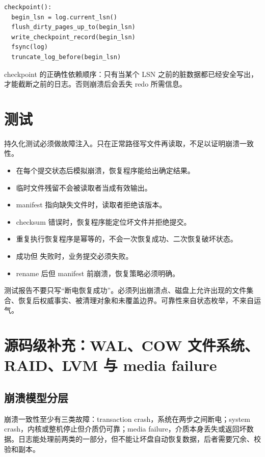 \begin{lstlisting}
checkpoint():
  begin_lsn = log.current_lsn()
  flush_dirty_pages_up_to(begin_lsn)
  write_checkpoint_record(begin_lsn)
  fsync(log)
  truncate_log_before(begin_lsn)
\end{lstlisting}

checkpoint 的正确性依赖顺序：只有当某个 LSN 之前的脏数据都已经安全写出，才能截断之前的日志。否则崩溃后会丢失 redo 所需信息。

\section{测试}

持久化测试必须做故障注入。只在正常路径写文件再读取，不足以证明崩溃一致性。

\begin{itemize}
\tightlist
\item 在每个提交状态后模拟崩溃，恢复程序能给出确定结果。
\item 临时文件残留不会被读取者当成有效输出。
\item manifest 指向缺失文件时，读取者拒绝该版本。
\item checksum 错误时，恢复程序能定位坏文件并拒绝提交。
\item 重复执行恢复程序是幂等的，不会一次恢复成功、二次恢复破坏状态。
\item {} 成功但  失败时，业务提交必须失败。
\item rename 后但 manifest 前崩溃，恢复策略必须明确。
\end{itemize}

测试报告不要只写“断电恢复成功”。必须列出崩溃点、磁盘上允许出现的文件集合、恢复后权威事实、被清理对象和未覆盖边界。可靠性来自状态枚举，不来自运气。

\section{源码级补充：WAL、COW 文件系统、RAID、LVM 与 media failure}

\subsection{崩溃模型分层}

崩溃一致性至少有三类故障：transaction crash，系统在两步之间断电；system crash，内核或整机停止但介质仍可靠；media failure，介质本身丢失或返回坏数据。日志能处理前两类的一部分，但不能让坏盘自动恢复数据，后者需要冗余、校验和副本。

